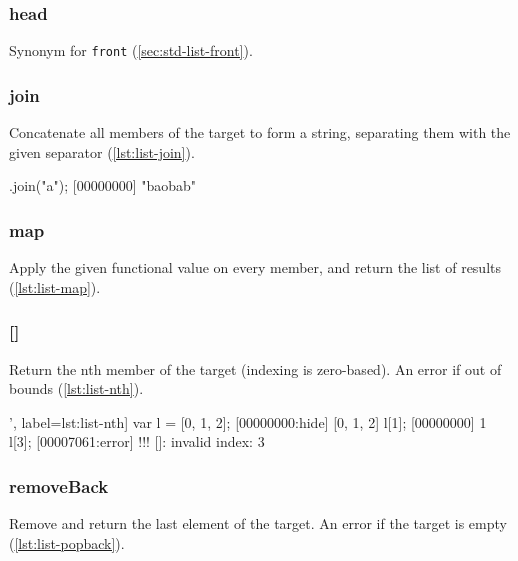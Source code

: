 \subsubsection{head}

Synonym for \lstinline|front| (\autoref{sec:std-list-front}).

\subsubsection{join}

Concatenate all members of the target to form a string, separating
them with the given separator (\autoref{lst:list-join}).

\begin{urbiscript}[caption=List.join, label=lst:list-join]
["b", "ob", "b"].join("a");
[00000000] "baobab"
\end{urbiscript}

\subsubsection{map}

Apply the given functional value on every member, and return the list
of results (\autoref{lst:list-map}).


\subsubsection{[]}
\label{sec:std-list-nth}

Return the nth member of the target (indexing is zero-based). An error
if out of bounds (\autoref{lst:list-nth}).

\begin{urbiscript}[caption=List.'[]', label=lst:list-nth]
var l = [0, 1, 2];
[00000000:hide] [0, 1, 2]
l[1];
[00000000] 1
l[3];
[00007061:error] !!! []: invalid index: 3
\end{urbiscript}

\subsubsection{removeBack}

Remove and return the last element of the target. An error if the
target is empty (\autoref{lst:list-popback}).


